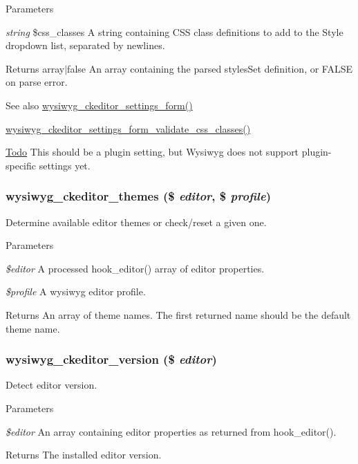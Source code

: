\begin{DoxyParams}{Parameters}
\item[{\em string}]\$css\_\-classes A string containing CSS class definitions to add to the Style dropdown list, separated by newlines.\end{DoxyParams}
\begin{DoxyReturn}{Returns}
array$|$false An array containing the parsed stylesSet definition, or FALSE on parse error.
\end{DoxyReturn}
\begin{DoxySeeAlso}{See also}
\hyperlink{ckeditor_8inc_a99ea1c868cbd240643f8f9299b73be3f}{wysiwyg\_\-ckeditor\_\-settings\_\-form()} 

\hyperlink{ckeditor_8inc_a8b614c7b72178d43bc7028fbd35be0e2}{wysiwyg\_\-ckeditor\_\-settings\_\-form\_\-validate\_\-css\_\-classes()}
\end{DoxySeeAlso}
\begin{Desc}
\item[\hyperlink{todo__todo000089}{Todo}]This should be a plugin setting, but Wysiwyg does not support plugin-\/specific settings yet. \end{Desc}
\hypertarget{ckeditor_8inc_a69108b6a32bbebf8a2e5de05de76c039}{
\subsubsection[{wysiwyg\_\-ckeditor\_\-themes}]{\setlength{\rightskip}{0pt plus 5cm}wysiwyg\_\-ckeditor\_\-themes (\$ {\em editor}, \/  \$ {\em profile})}}
\label{ckeditor_8inc_a69108b6a32bbebf8a2e5de05de76c039}
Determine available editor themes or check/reset a given one.


\begin{DoxyParams}{Parameters}
\item[{\em \$editor}]A processed hook\_\-editor() array of editor properties. \item[{\em \$profile}]A wysiwyg editor profile.\end{DoxyParams}
\begin{DoxyReturn}{Returns}
An array of theme names. The first returned name should be the default theme name. 
\end{DoxyReturn}
\hypertarget{ckeditor_8inc_a3b5d7fe336c32260d82eb539340a5fff}{
\subsubsection[{wysiwyg\_\-ckeditor\_\-version}]{\setlength{\rightskip}{0pt plus 5cm}wysiwyg\_\-ckeditor\_\-version (\$ {\em editor})}}
\label{ckeditor_8inc_a3b5d7fe336c32260d82eb539340a5fff}
Detect editor version.


\begin{DoxyParams}{Parameters}
\item[{\em \$editor}]An array containing editor properties as returned from hook\_\-editor().\end{DoxyParams}
\begin{DoxyReturn}{Returns}
The installed editor version. 
\end{DoxyReturn}
